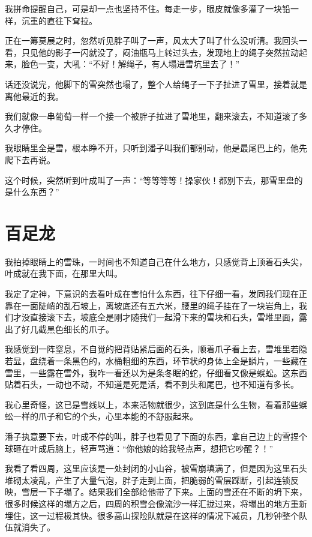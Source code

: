 我拼命提醒自己，可是却一点也坚持不住。每走一步，眼皮就像多灌了一块铅一样，沉重的直往下耷拉。

正在一筹莫展之时，忽然听见胖子叫了一声，风太大了叫了什么没听清。我回头一看，只见他的影子一闪就没了，闷油瓶马上转过头去，发现地上的绳子突然拉动起来，脸色一变，大吼：“不好！解绳子，有人塌进雪坑里去了！”

话还没说完，他脚下的雪突然也塌了，整个人给绳子一下子扯进了雪里，接着就是离他最近的我。

我们就像一串葡萄一样一个接一个被胖子拉进了雪地里，翻来滚去，不知道滚了多久才停住。

我眼睛里全是雪，根本睁不开，只听到潘子叫我们都别动，他是最尾巴上的，他先爬下去再说。

这个时候，突然听到叶成叫了一声：“等等等等！操家伙！都别下去，那雪里盘的是什么东西？”

\chapter{百足龙}

我拍掉眼睛上的雪珠，一时间也不知道自己在什么地方，只感觉背上顶着石头尖，叶成就在我下面，在那里大叫。

我定了定神，下意识的去看叶成在害怕什么东西，往下仔细一看，发同我们现在正靠在一面陡峭的乱石坡上，离坡底还有五六米，腰里的绳子挂在了一块岩角上，我们才没直接滚下去，坡底全是刚才随我们一起滑下来的雪块和石头，雪堆里面，露出了好几截黑色细长的爪子。

我感觉到一阵窒息，不自觉的把背贴紧后面的石头，顺着爪子看上去，雪堆里若隐若显，盘绕着一条黑色的，水桶粗细的东西，环节状的身体上全是鳞片，一些藏在雪里，一些露在雪外，我咋一看还以为是条冬眠的蛇，仔细看又像是蜈蚣。这东西贴着石头，一动也不动，不知道是死是活，看不到头和尾巴，也不知道有多长。

我心里奇怪，这已是雪线以上，本来活物就很少，这到底是什么生物，看着那些蜈蚣一样的爪子和它的个头，心里本能的不舒服起来。

潘子执意要下去，叶成不停的叫，胖子也看见了下面的东西，拿自己边上的雪捏个球砸在叶成后脑上，轻声骂道：“你他娘的给我轻点声，想把它吵醒？！”

我看了看四周，这里应该是一处封闭的小山谷，被雪崩填满了，但是因为这里石头堆砌太凌乱，产生了大量气泡，胖子走到上面，把脆弱的雪层踩断，引起连锁反映，雪层一下子塌了。结果我们全部给他带了下来。上面的雪还在不断的坍下来，很多时候这样的塌方之后，四周的积雪会像流沙一样汇拢过来，将塌出的地方重新埋住，这一过程极其快。很多高山探险队就是在这样的情况下减员，几秒钟整个队伍就消失了。

